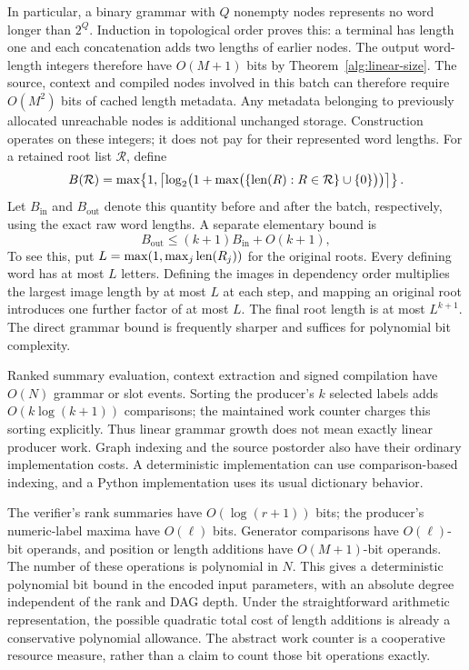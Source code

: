 In particular, a binary grammar with $Q$ nonempty nodes represents no
word longer than $2^Q$. Induction in topological order proves this:
a terminal has length one and each concatenation adds two lengths
of earlier nodes. The output word-length integers therefore have
$O(M+1)$ bits by Theorem~\ref{alg:linear-size}. The source, context and
compiled nodes involved in this batch can therefore require $O(M^2)$
bits of cached length metadata. Any metadata belonging to previously
allocated unreachable nodes is additional unchanged storage. Construction
operates on these integers; it does not pay for their represented
word lengths. For a retained root list $\mathcal R$, define
\[
 B(\mathcal R)=\max\!\left\{1,
   \left\lceil\log_2\!\left(1+
     \max\bigl(\{\operatorname{len}(R):R\in\mathcal R\}\cup\{0\}\bigr)
   \right)\right\rceil\right\}.
\]
Let $B_{\mathrm{in}}$ and $B_{\mathrm{out}}$ denote this quantity before
and after the batch, respectively, using the exact raw word lengths.
A separate elementary bound is
\[
 B_{\mathrm{out}}\le (k+1)B_{\mathrm{in}}+O(k+1),
\]
To see this, put $L=\max(1,\max_j\operatorname{len}(R_j))$ for the original roots.
Every defining word has at most $L$ letters. Defining the images in
dependency order multiplies the largest image length by at most $L$
at each step, and mapping an original root introduces one further
factor of at most $L$. The final root length is at most $L^{k+1}$.
The direct grammar bound is frequently sharper and suffices for
polynomial bit complexity.

Ranked summary evaluation, context extraction and signed compilation
have $O(N)$ grammar or slot events. Sorting the producer's $k$ selected
labels adds $O(k\log(k+1))$ comparisons; the maintained work counter
charges this sorting explicitly. Thus linear grammar growth does not
mean exactly linear producer work. Graph indexing and the source
postorder also have their ordinary implementation costs. A deterministic
implementation can use comparison-based indexing, and a Python
implementation uses its usual dictionary behavior.

The verifier's rank summaries have $O(\log(r+1))$ bits; the producer's
numeric-label maxima have $O(\ell)$ bits. Generator comparisons have
$O(\ell)$-bit operands, and position or length additions have
$O(M+1)$-bit operands. The number of these operations is polynomial
in $N$. This gives a deterministic polynomial bit bound in the encoded
input parameters, with an absolute degree independent of the rank
and DAG depth. Under the straightforward arithmetic representation,
the possible quadratic total cost of length additions is already a
conservative polynomial allowance. The abstract work counter is a
cooperative resource measure, rather than a claim to count those bit
operations exactly.

